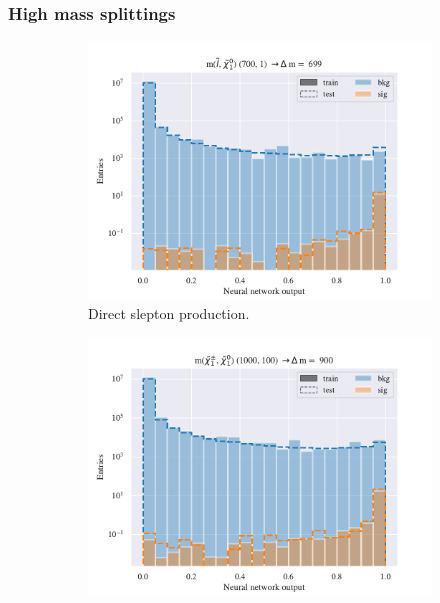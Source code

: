 \subsubsection{High mass splittings}

\begin{figure}[H]
    \centering
    \begin{subfigure}[t!]{0.49\textwidth}
        \includegraphics[width = \textwidth]{Figures/SlepSlep/ML/NN/Low_level/High/scaled_train_test_396033.pdf}
        \caption{Direct slepton production.}
        \label{fig:SlepslepNNLow}
    \end{subfigure}
    \begin{subfigure}[t!]{0.49\textwidth}
        \includegraphics[width = \textwidth]{Figures/SlepSnu/NN/Low_level/High/scaled_train_test_397169.pdf}

\end{subfigure}
\end{figure}
